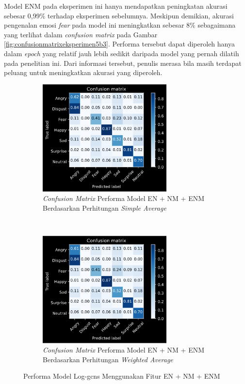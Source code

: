Model ENM pada eksperimen ini hanya mendapatkan peningkatan akurasi sebesar 0,99\% terhadap eksperimen sebelumnya. Meskipun demikian, akurasi pengenalan emosi \textit{fear} pada model ini meningkatkan sebesar 8\% sebagaimana yang terlihat dalam \textit{confusion matrix} pada Gambar \ref{fig:confusionmatrixeksperimen5b3}. Performa tersebut dapat diperoleh hanya dalam \textit{epoch} yang relatif jauh lebih sedikit daripada model yang pernah dilatih pada penelitian ini. Dari informasi tersebut, penulis merasa bila masih terdapat peluang untuk meningkatkan akurasi yang diperoleh.

\begin{figure}[!t]
    \ContinuedFloat
    \centering
    \begin{subfigure}[t]{6.75cm}
        \includegraphics[width=6.75cm]{gambar/eksperimen5b4_matriks1.png}
        \caption{\textit{Confusion Matrix} Performa Model EN + NM + ENM Berdasarkan Perhitungan \textit{Simple Average}}
        \label{fig:confusionmatrixeksperimen5b41}
    \end{subfigure}
    ~~~
    \begin{subfigure}[t]{6.75cm}
        \includegraphics[width=6.75cm]{gambar/eksperimen5b4_matriks2.png}
        \caption{\textit{Confusion Matrix} Performa Model EN + NM + ENM Berdasarkan Perhitungan \textit{Weighted Average}}
        \label{fig:confusionmatrixeksperimen5b42}
    \end{subfigure}
    \caption{Performa Model Log-\acrshort{gcns} Menggunakan Fitur EN + NM + ENM}
    \label{fig:hasileksperimen5b4}
\end{figure}
